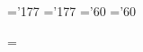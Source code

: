 \def\Sim{\mathop{\sim}}
\def\card{\mathop{\rm card}\nolimits}
\def\dim{\mathop{\rm dim}\nolimits}
\def\det{\mathop{\hbox{\rm d\'et}}\nolimits}
\def\mod{\mathop{\rm mod}\nolimits}
\def\sgn{\mathop{\rm sgn}\nolimits}



\def\quote{\leavevmode\raise.24ex\hbox{$\scriptscriptstyle\langle\!\langle\>$}}    %
\def\etouq{\leavevmode\raise.24ex\hbox{$\scriptscriptstyle\>\rangle\!\rangle$}}    %



\def\PAR{\par}


\def\signeat{\catcode`@=11}





\skewchar\eighti='177 \skewchar\sixi='177
\skewchar\eightsy='60 \skewchar\sixsy='60

%
%
%
\let\footnotea=\footnote
\newinsert\footins
\def\footnote#1{\let\@sf\empty %
  \ifhmode\edef\@sf{\spacefactor\the\spacefactor}\/\fi
\hbox{$^{(#1)}$}\@sf\vfootnote{#1.}}
\def\vfootnote#1{\insert\footins\bgroup
  \interlinepenalty\interfootnotelinepenalty
  \splittopskip\ht\strutbox %
  \splitmaxdepth\dp\strutbox \floatingpenalty\@MM
  \leftskip\z@skip \rightskip\z@skip \spaceskip\z@skip \xspaceskip\z@skip
  \textindent{#1}\footstrut\futurelet\next\fo@t}
\def\fo@t{\ifcat\bgroup\noexpand\next \let\next\f@@t
  \else\let\next\f@t\fi \next}
\def\f@@t{\bgroup\aftergroup\@foot\let\next}
\def\f@t#1{#1\@foot}
\def\@foot{\strut\egroup}
\def\footstrut{\vbox to\splittopskip{}}
\skip\footins=\bigskipamount %
\count{} %
\dimen\footins=8in %

